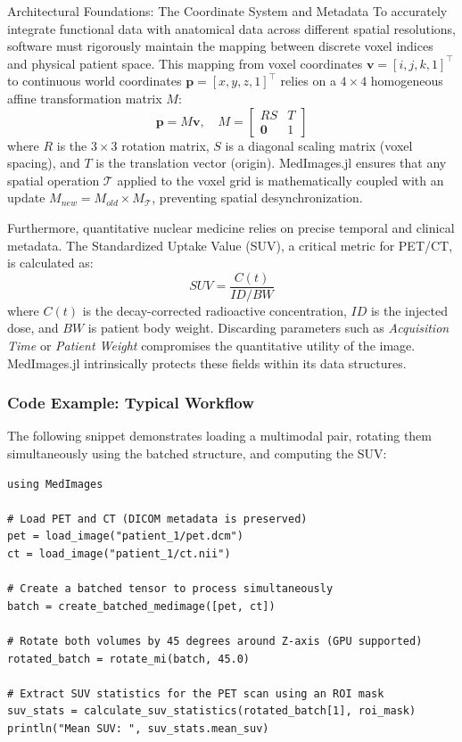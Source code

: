 \documentclass[a4paper,10pt]{elsarticle}
\begin{document}
Architectural Foundations: The Coordinate System and Metadata
To accurately integrate functional data with anatomical data across different spatial resolutions, software must rigorously maintain the mapping between discrete voxel indices and physical patient space. This mapping from voxel coordinates $\mathbf{v} = [i, j, k, 1]^\top$ to continuous world coordinates $\mathbf{p} = [x, y, z, 1]^\top$ relies on a $4 \times 4$ homogeneous affine transformation matrix $M$:
\begin{equation}
\mathbf{p} = M \mathbf{v}, \quad M = 
\begin{bmatrix} 
R S & T \\
\mathbf{0} & 1
\end{bmatrix}
\end{equation}
where $R$ is the $3 \times 3$ rotation matrix, $S$ is a diagonal scaling matrix (voxel spacing), and $T$ is the translation vector (origin). MedImages.jl ensures that any spatial operation $\mathcal{T}$ applied to the voxel grid is mathematically coupled with an update $M_{new} = M_{old} \times M_{\mathcal{T}}$, preventing spatial desynchronization.

Furthermore, quantitative nuclear medicine relies on precise temporal and clinical metadata. The Standardized Uptake Value (SUV), a critical metric for PET/CT, is calculated as:
\begin{equation}
SUV = \frac{C(t)}{ID / BW}
\end{equation}
where $C(t)$ is the decay-corrected radioactive concentration, $ID$ is the injected dose, and $BW$ is patient body weight. Discarding parameters such as \textit{Acquisition Time} or \textit{Patient Weight} compromises the quantitative utility of the image. MedImages.jl intrinsically protects these fields within its data structures.

\subsubsection*{Code Example: Typical Workflow}
The following snippet demonstrates loading a multimodal pair, rotating them simultaneously using the batched structure, and computing the SUV:

\begin{lstlisting}[basicstyle=\ttfamily\footnotesize]
using MedImages

# Load PET and CT (DICOM metadata is preserved)
pet = load_image("patient_1/pet.dcm")
ct = load_image("patient_1/ct.nii")

# Create a batched tensor to process simultaneously
batch = create_batched_medimage([pet, ct])

# Rotate both volumes by 45 degrees around Z-axis (GPU supported)
rotated_batch = rotate_mi(batch, 45.0)

# Extract SUV statistics for the PET scan using an ROI mask
suv_stats = calculate_suv_statistics(rotated_batch[1], roi_mask)
println("Mean SUV: ", suv_stats.mean_suv)
\end{lstlisting}
\end{document}
